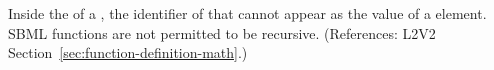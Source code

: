 Inside the  of a \FunctionDefinition, the identifier of that
\FunctionDefinition cannot appear as the value of a  element.
SBML functions are not permitted to be recursive.  (References: L2V2
Section~\ref{sec:function-definition-math}.)
